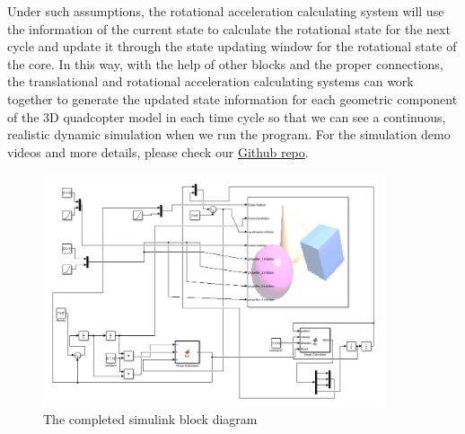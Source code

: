 \newline
\newline
Under such assumptions, the rotational acceleration calculating system will use the information of the current state to calculate the rotational state for the next cycle and update it through the state updating window for the rotational state of the core.
\newline
\newline
In this way, with the help of other blocks and the proper connections, the translational and rotational acceleration calculating systems can work together to generate the updated state information for each geometric component of the 3D quadcopter model in each time cycle so that we can see a continuous, realistic dynamic simulation when we run the program. For the simulation demo videos and more details, please check our \href{https://github.com/Amir-Omidfar/183DB-}{Github repo}.
\begin{figure}[h]
\centering
\includegraphics[width=0.9\textwidth]{./Lin_img/7.JPG}
\caption{The completed simulink block diagram}
\end{figure}
\newline
